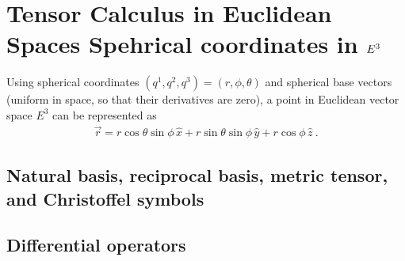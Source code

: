 \documentclass[letterpaper,10pt,english]{jupyterBook}
\begin{document}
\sphinxstepscope


\section{Tensor Calculus in Euclidean Spaces \sphinxhyphen{} Spehrical coordinates in \protect\(E^3\protect\)}
\label{\detokenize{ch/tensor-algebra-calculus/calculus-euclidean-spherical:tensor-calculus-in-euclidean-spaces-spehrical-coordinates-in-e-3}}\label{\detokenize{ch/tensor-algebra-calculus/calculus-euclidean-spherical:tensor-calculus-spherical}}\label{\detokenize{ch/tensor-algebra-calculus/calculus-euclidean-spherical::doc}}
\sphinxAtStartPar
Using spherical coordinates \((q^1, q^2, q^3) = (r, \phi, \theta)\) and spherical base vectors (uniform in space, so that their derivatives are zero), a point in Euclidean vector space \(E^3\) can be represented as
\begin{equation*}
\begin{split}\vec{r} = r \cos \theta \sin \phi \, \hat{x} + r \sin \theta \sin \phi \, \hat{y} + r \cos \phi \, \hat{z} \ .\end{split}
\end{equation*}

\subsection{Natural basis, reciprocal basis, metric tensor, and Christoffel symbols}
\label{\detokenize{ch/tensor-algebra-calculus/calculus-euclidean-spherical:natural-basis-reciprocal-basis-metric-tensor-and-christoffel-symbols}}\label{\detokenize{ch/tensor-algebra-calculus/calculus-euclidean-spherical:tensor-calculus-spherical-metric}}

\subsection{Differential operators}
\label{\detokenize{ch/tensor-algebra-calculus/calculus-euclidean-spherical:differential-operators}}\label{\detokenize{ch/tensor-algebra-calculus/calculus-euclidean-spherical:tensor-calculus-spherical-differential-operators}}
\end{document}
